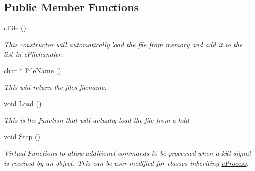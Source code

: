 \subsection*{Public Member Functions}
\begin{DoxyCompactItemize}
\item 
\hypertarget{classc_file_a5bb81f36e954af61b581e3c1fd06e0de}{
\hyperlink{classc_file_a5bb81f36e954af61b581e3c1fd06e0de}{cFile} ()}
\label{classc_file_a5bb81f36e954af61b581e3c1fd06e0de}

\begin{DoxyCompactList}\small\item\em This constructor will automatically load the file from memory and add it to the list in cFilehandler. \end{DoxyCompactList}\item 
\hypertarget{classc_file_a7224559b2485e53608bd6ba9e21d1122}{
char $\ast$ \hyperlink{classc_file_a7224559b2485e53608bd6ba9e21d1122}{FileName} ()}
\label{classc_file_a7224559b2485e53608bd6ba9e21d1122}

\begin{DoxyCompactList}\small\item\em This will return the files filename. \end{DoxyCompactList}\item 
\hypertarget{classc_file_aa5891f6208183a26e7fde7d8dee62ffc}{
void \hyperlink{classc_file_aa5891f6208183a26e7fde7d8dee62ffc}{Load} ()}
\label{classc_file_aa5891f6208183a26e7fde7d8dee62ffc}

\begin{DoxyCompactList}\small\item\em This is the function that will actually load the file from a hdd. \end{DoxyCompactList}\item 
\hypertarget{classc_file_a90db2618179b8d3206285a5381ecdcf9}{
void \hyperlink{classc_file_a90db2618179b8d3206285a5381ecdcf9}{Stop} ()}
\label{classc_file_a90db2618179b8d3206285a5381ecdcf9}

\begin{DoxyCompactList}\small\item\em Virtual Functions to allow additional commands to be processed when a kill signal is received by an object. This can be user modified for classes inheriting \hyperlink{classc_process}{cProcess}. \end{DoxyCompactList}\end{DoxyCompactItemize}
